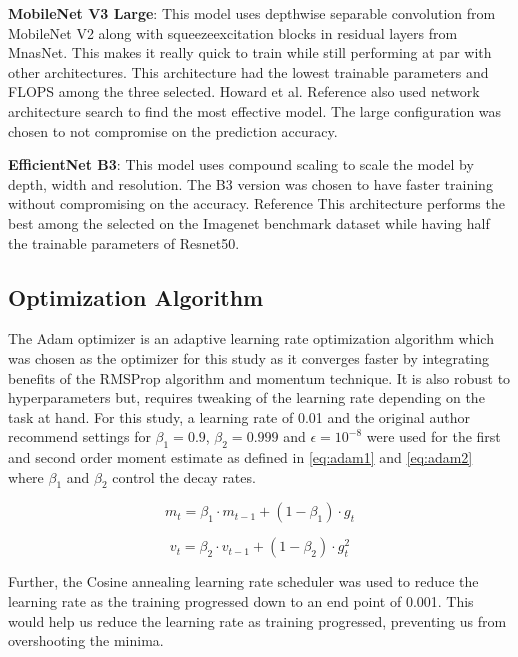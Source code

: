 \documentclass[conference]{IEEEtran}
\begin{document}
\textbf{MobileNet V3 Large}: This model uses depthwise separable convolution  from MobileNet V2 along with squeezeexcitation blocks in residual layers  from MnasNet. This makes it really quick to train while still performing at par with other architectures. This architecture had the lowest trainable parameters and FLOPS among the three selected. Howard et al. Reference\cite{b19} also used network architecture search to find the most effective model. The large configuration was chosen to not compromise on the prediction accuracy.

\textbf{EfficientNet B3}: This model uses compound scaling to scale the model by 
depth, width and resolution. The B3 version was chosen to have faster training without compromising on the accuracy. Reference\cite{b20} This architecture performs the 
best among the selected on the Imagenet benchmark dataset while having half  the trainable parameters of Resnet50.


\subsection{Optimization Algorithm}
The Adam optimizer \cite{b21} is an adaptive learning rate optimization algorithm which was chosen as the optimizer for this study as it converges faster by integrating benefits of the RMSProp algorithm and momentum technique. It is also robust to hyperparameters but, requires tweaking of the learning rate depending on the task at hand. For this study, a learning rate of 0.01 and the original author recommend settings for $\beta_{1} = 0.9$, $\beta_{2} = 0.999$ and $\epsilon = 10^{-8}$ were used for the first and second order moment estimate as defined in \eqref{eq:adam1} and \eqref{eq:adam2} where $\beta_{1}$ and 
$\beta_{2}$ control the decay rates.

 \begin{equation}
 m_{t} = \beta_{1} \cdot m_{t-1} + (1 - \beta_{1}) \cdot g_{t}
 \label{eq:adam1}
 \end{equation}

 \begin{equation}
   v_{t} = \beta_{2} \cdot v_{t-1} + (1 - \beta_{2}) \cdot g_{t}^{2}
   \label{eq:adam2}
   \end{equation}

Further, the Cosine annealing \cite{b22} learning rate scheduler was used 
to reduce the learning rate as the training progressed down to an end point of 0.001. This 
would help us reduce the learning rate as training progressed, preventing us from overshooting the minima.
\end{document}
